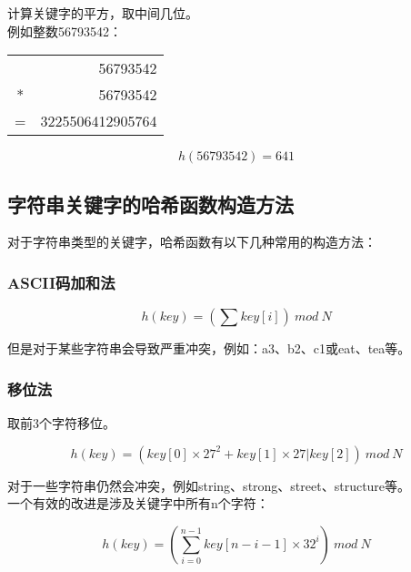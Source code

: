 计算关键字的平方，取中间几位。\\

例如整数56793542：

\begin{table}[H]
	\centering
	\begin{tabular}{cD{.}{.}{3}}
		  & 56793542         \\
		* & 56793542         \\
		\hline
		= & 3225506412905764
	\end{tabular}
\end{table}

\vspace{-1cm}

$$
	h(56793542) = 641
$$

\vspace{0.5cm}

\subsection{字符串关键字的哈希函数构造方法}

对于字符串类型的关键字，哈希函数有以下几种常用的构造方法：

\subsubsection{ASCII码加和法}

\vspace{-0.5cm}

$$
	h(key) = \left(\sum key[i] \right)\ mod\ N
$$

但是对于某些字符串会导致严重冲突，例如：a3、b2、c1或eat、tea等。\\

\subsubsection{移位法}

取前3个字符移位。

\vspace{-0.5cm}

$$
	h(key) = \left(key[0] \times 27^2 + key[1] \times 27 | key[2] \right)\ mod\ N
$$

对于一些字符串仍然会冲突，例如string、strong、street、structure等。\\

一个有效的改进是涉及关键字中所有n个字符：

$$
	h(key) = \left( \sum_{i=0}^{n-1} key[n-i-1] \times 32^i \right)\ mod\ N
$$

